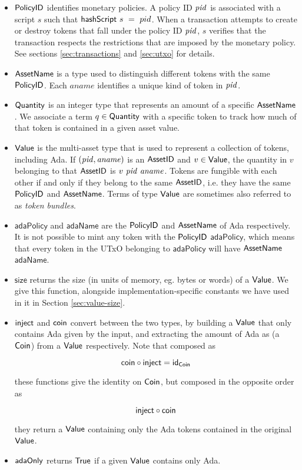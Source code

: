 \begin{itemize}
  \item $\mathsf{PolicyID}$ identifies monetary policies. A policy ID $\mathit{pid}$ is associated with a script
    $s$ such that $\mathsf{hashScript}~s~=~pid$. When a transaction attempts to create or destroy tokens
    that fall under the policy ID $\mathit{pid}$,
    $s$ verifies that the transaction
    respects the restrictions that are imposed by the monetary policy.
    See sections \ref{sec:transactions} and \ref{sec:utxo} for details.

  \item $\mathsf{AssetName}$ is a type used to distinguish different tokens with the same $\mathsf{PolicyID}$.
    Each $aname$ identifies a unique kind of token in $\mathit{pid}$.

  \item $\mathsf{Quantity}$ is an integer type that represents an amount of a specific $\mathsf{AssetName}$. We associate
    a term $q\in\mathsf{Quantity}$ with a specific token to track how much of that token is contained in a given asset value.

  \item $\mathsf{Value}$ is the multi-asset type that is used to represent
    a collection of tokens, including Ada. If $(\mathit{pid}, \mathit{aname})$ is an $\mathsf{AssetID}$ and $v \in \mathsf{Value}$,
    the quantity in $v$ belonging to that $\mathsf{AssetID}$ is $v~\mathit{pid}~\mathit{aname}$.
    Tokens are fungible with each other if and only if they belong to the same $\mathsf{AssetID}$,
    i.e. they have the same $\mathsf{PolicyID}$ and $\mathsf{AssetName}$. Terms of type $\mathsf{Value}$ are sometimes also referred to as
    \emph{token bundles}.

  \item $\mathsf{adaPolicy}$ and $\mathsf{adaName}$ are the $\mathsf{PolicyID}$ and $\mathsf{AssetName}$ of Ada respectively.
    It is not possible to mint any token with the $\mathsf{PolicyID}$ $\mathsf{adaPolicy}$, which means that every
    token in the UTxO belonging to $\mathsf{adaPolicy}$ will have $\mathsf{AssetName}$ $\mathsf{adaName}$.

  \item $\mathsf{size}$ returns the size (in units of memory, eg. bytes or words) of a $\mathsf{Value}$.
  We give this function, alongside implementation-specific constants we have used in it in Section \ref{sec:value-size}.

  \item $\mathsf{inject}$ and $\mathsf{coin}$ convert between the two types,
  by building a $\mathsf{Value}$ that only contains Ada given by the input, and extracting
  the amount of Ada as (a $\mathsf{Coin}$) from a $\mathsf{Value}$ respectively.
  Note that composed as

  \[\mathsf{coin} \circ \mathsf{inject} = \mathsf{id}_{\mathsf{Coin}}\]

  these functions give the identity on $\mathsf{Coin}$, but composed in the opposite order as

  \[\mathsf{inject} \circ \mathsf{coin}\]

  they return a $\mathsf{Value}$ containing only the Ada tokens contained in the original $\mathsf{Value}$.

  \item $\mathsf{adaOnly}$ returns $\mathsf{True}$ if a given $\mathsf{Value}$ contains only Ada.
\end{itemize}

